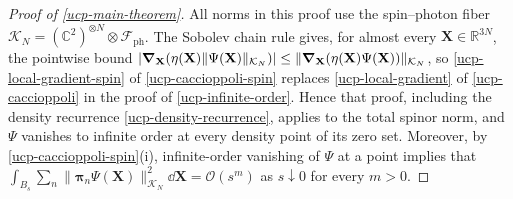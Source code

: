 \documentclass[final,reqno]{amsart}
\theoremstyle{remark}
\newcommand{\RR}{\mathbb{R}}
\newcommand{\CC}{\mathbb{C}}
\newcommand{\ph}{\mathrm{ph}}
\newcommand{\Fock}{\mathcal{F}}
\newcommand{\vpi}{{\bm{\pi}}}
\newcommand{\vX}{{\mathbf{X}}}
\begin{document}
\begin{proof}[Proof of \cref{ucp-main-theorem}]
All norms in this proof use the spin--photon fiber
$\mathcal K_N=(\CC^2)^{\otimes N}\otimes\Fock_\ph$.
The Sobolev chain rule gives, for almost every $\vX\in\RR^{3N}$, the
pointwise bound
$|\grad_{\vX}(\eta(\vX)\|\Psi(\vX)\|_{\mathcal K_N})|\leq\|\grad_{\vX}(\eta(\vX)\Psi(\vX))\|_{\mathcal K_N}$, so
\cref{ucp-local-gradient-spin} of \cref{ucp-caccioppoli-spin} replaces \cref{ucp-local-gradient} of \cref{ucp-caccioppoli} in
the proof of \cref{ucp-infinite-order}.  Hence that proof, including
the density recurrence \cref{ucp-density-recurrence}, applies to the
total spinor norm, and $\Psi$ vanishes to infinite order at every
density point of its zero set.  Moreover, by
\cref{ucp-caccioppoli-spin}(i), infinite-order vanishing of $\Psi$ at
a point implies that
$\int_{B_s}\sum_n\|\vpi_n\Psi(\vX)\|_{\mathcal K_N}^2\dd\vX=\mathcal O(s^m)$
as $s\downarrow0$ for every $m>0$.


\end{proof}
\end{document}
